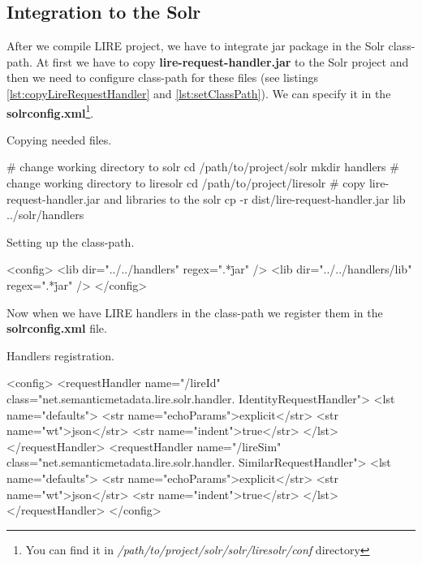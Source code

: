 \documentclass[12pt,a4paper]{report}
\begin{document}
\subsection{Integration to the Solr}

After we compile LIRE project, we have to integrate jar package in the Solr class-path. At first we have to copy \textbf{lire-request-handler.jar} to the Solr project and then we need to configure class-path for these files (see listings \ref{lst:copyLireRequestHandler} and \ref{lst:setClassPath}). We can specify it in the \textbf{solrconfig.xml}\footnote{You can find it in \textit{/path/to/project/solr/solr/liresolr/conf} directory}.

\begin{listing}[H]
\caption{Copying needed files.}
\label{lst:copyLireRequestHandler}
\begin{bashcode}
# change working directory to solr
cd /path/to/project/solr
mkdir handlers
# change working directory to liresolr
cd /path/to/project/liresolr
# copy lire-request-handler.jar and libraries to the solr
cp -r dist/lire-request-handler.jar lib ../solr/handlers
\end{bashcode}
\end{listing}

\begin{listing}[H]
\caption{Setting up the class-path.}
\label{lst:setClassPath}
\begin{xmlcode}
<config>
  <lib dir="../../handlers" regex=".*\.jar" />
  <lib dir="../../handlers/lib" regex=".*\.jar" />
</config>
\end{xmlcode}
\end{listing}

Now when we have LIRE handlers in the class-path we register them in the \textbf{solrconfig.xml} file.

\begin{listing}[H]
\caption{Handlers registration.}
\begin{xmlcode}
<config>
  <requestHandler name="/lireId"
  class="net.semanticmetadata.lire.solr.handler.
  IdentityRequestHandler">
     <lst name="defaults">
       <str name="echoParams">explicit</str>
       <str name="wt">json</str>
       <str name="indent">true</str>
     </lst>
  </requestHandler>
  <requestHandler name="/lireSim"
  class="net.semanticmetadata.lire.solr.handler.
  SimilarRequestHandler">
     <lst name="defaults">
       <str name="echoParams">explicit</str>
       <str name="wt">json</str>
       <str name="indent">true</str>
     </lst>
  </requestHandler>
</config>
\end{xmlcode}
\end{listing}
\end{document}
